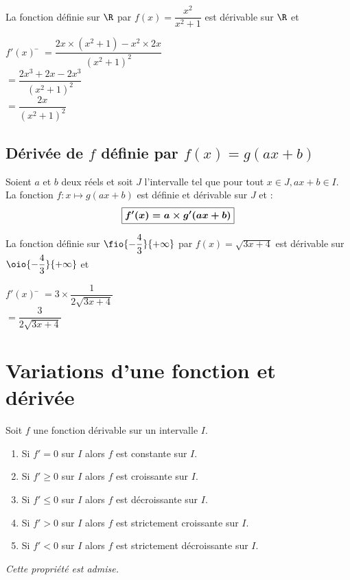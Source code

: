 \documentclass[a4paper,11pt,cours]{nsi} %
\begin{document}
\begin{exemple}[]
	La fonction définie sur $\R$ par $f(x)=\dfrac{x^2}{x^2+1}$ est dérivable sur $\R$ et 
	\begin{tabbing}
		$f'(x)$	\=	$=\dfrac{2x\times(x^2+1)-x^2\times 2x}{(x^2+1)^2}$\\
		\>	$=\dfrac{2x^3+2x-2x^3}{(x^2+1)^2}$\\
		\>	$=\dfrac{2x}{(x^2+1)^2}$
	\end{tabbing}
\end{exemple}

\subsection{Dérivée de $f$ définie par $f(x)=g(ax+b)$}
\begin{propriete}[ ]
	Soient $a$ et $b$ deux réels et soit $J$ l'intervalle tel que pour tout $x\in J, ax+b \in I$.\\
	La fonction $f:x\mapsto g(ax+b)$ est définie et dérivable sur $J$ et :
		$${\boldmath\boxed{f'(x)=a\times g'(ax+b)}}$$
\end{propriete}

\begin{exemple}[ ]
	La fonction définie sur $\fio{-\dfrac{4}{3}}{+\infty}$ par $f(x)=\sqrt{3x+4}$ est dérivable sur $\oio{-\dfrac{4}{3}}{+\infty}$ et 
	\begin{tabbing}
		$f'(x)$ \=	$=3\times \dfrac{1}{2\sqrt{3x+4}}$\\[0.5em]
		\>	$=\dfrac{3}{2\sqrt{3x+4}}$
	\end{tabbing}
\end{exemple}

\section{Variations d'une fonction et dérivée}


\begin{propriete}[]
	Soit $f$ une fonction dérivable sur un intervalle $I$.
	\begin{enumerate}[label=\textbullet]	
		\item 	Si $f'=0$ sur $I$ alors $f$ est constante sur $I$.
		\item 	Si $f'\geqslant 0$ sur $I$ alors $f$ est croissante sur $I$.
		\item 	Si $f'\leqslant 0$ sur $I$ alors $f$ est décroissante sur $I$.
		\item 	Si $f'>0$ sur $I$ alors $f$ est strictement croissante sur $I$.
		\item 	Si $f'<0$ sur $I$ alors $f$ est strictement décroissante sur $I$.
	\end{enumerate}
\end{propriete}
\emph{Cette propriété est admise.}
\end{document}
